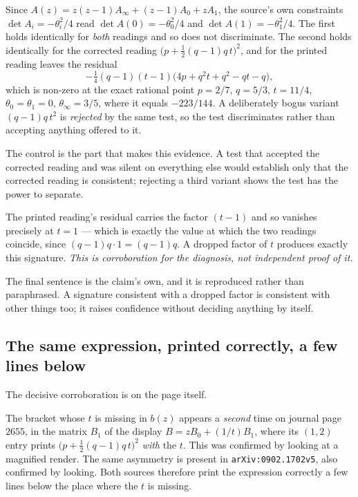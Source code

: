 \begin{remark}
Since $A(z)=z(z-1)A_\infty+(z-1)A_0+zA_1$, the source's own constraints
$\det A_i=-\theta_i^{2}/4$ read $\det A(0)=-\theta_0^{2}/4$ and
$\det A(1)=-\theta_1^{2}/4$. The first holds identically for \emph{both}
readings and so does not discriminate. The second holds identically for the
corrected reading $\bigl(p+\tfrac12(q-1)q\,t\bigr)^{2}$, and for the printed
reading leaves the residual
\[
  -\tfrac14 (q-1)(t-1)\bigl(4p+q^{2}t+q^{2}-qt-q\bigr),
\]
which is non-zero at the exact rational point $p=2/7$, $q=5/3$, $t=11/4$,
$\theta_0=\theta_1=0$, $\theta_\infty=3/5$, where it equals $-223/144$. A
deliberately bogus variant $(q-1)q\,t^{2}$ is \emph{rejected} by the same test,
so the test discriminates rather than accepting anything offered to it.
\end{remark}

The control is the part that makes this evidence. A test that accepted the
corrected reading and was silent on everything else would establish only that
the corrected reading is consistent; rejecting a third variant shows the test
has the power to separate.

\begin{remark}
The printed reading's residual carries the factor $(t-1)$ and so vanishes
precisely at $t=1$ --- which is exactly the value at which the two readings
coincide, since $(q-1)q\cdot1=(q-1)q$. A dropped factor of $t$ produces exactly
this signature. \emph{This is corroboration for the diagnosis, not independent
proof of it.}
\end{remark}

The final sentence is the claim's own, and it is reproduced rather than
paraphrased. A signature consistent with a dropped factor is consistent with
other things too; it raises confidence without deciding anything by itself.

\subsection{The same expression, printed correctly, a few lines below}\label{ssec:typo-b1}

The decisive corroboration is on the page itself.

\begin{remark}
The bracket whose $t$ is missing in $b(z)$ appears a \emph{second} time on
journal page $2655$, in the matrix $B_1$ of the display $B=zB_0+(1/t)B_1$,
where its $(1,2)$ entry prints $\bigl(p+\tfrac12(q-1)q\,t\bigr)^{2}$ \emph{with}
the $t$. This was confirmed by looking at a magnified render. The same
asymmetry is present in \texttt{arXiv:0902.1702v5}, also confirmed by looking.
Both sources therefore print the expression correctly a few lines below the
place where the $t$ is missing.
\end{remark}

